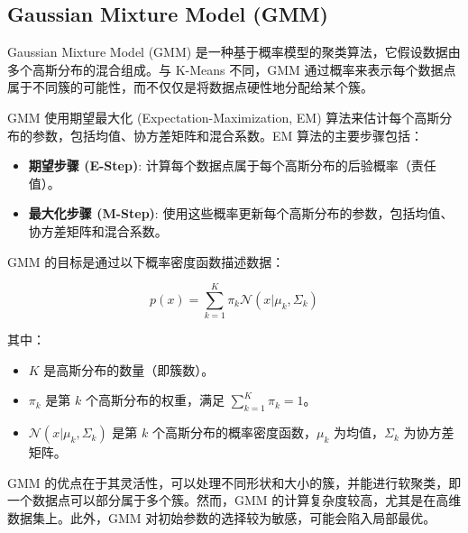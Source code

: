 \documentclass{article}
\begin{document}
\subsection{Gaussian Mixture Model (GMM)}

Gaussian Mixture Model (GMM) 是一种基于概率模型的聚类算法，它假设数据由多个高斯分布的混合组成。与 K-Means 不同，GMM 通过概率来表示每个数据点属于不同簇的可能性，而不仅仅是将数据点硬性地分配给某个簇。

GMM 使用期望最大化 (Expectation-Maximization, EM) 算法来估计每个高斯分布的参数，包括均值、协方差矩阵和混合系数。EM 算法的主要步骤包括：

\begin{itemize}
    \item \textbf{期望步骤 (E-Step)}: 计算每个数据点属于每个高斯分布的后验概率（责任值）。
    \item \textbf{最大化步骤 (M-Step)}: 使用这些概率更新每个高斯分布的参数，包括均值、协方差矩阵和混合系数。
\end{itemize}

GMM 的目标是通过以下概率密度函数描述数据：

\[
p(x) = \sum_{k=1}^{K} \pi_k \mathcal{N}(x | \mu_k, \Sigma_k)
\]

其中：
\begin{itemize}
    \item \( K \) 是高斯分布的数量（即簇数）。
    \item \( \pi_k \) 是第 \( k \) 个高斯分布的权重，满足 \(\sum_{k=1}^{K} \pi_k = 1\)。
    \item \( \mathcal{N}(x | \mu_k, \Sigma_k) \) 是第 \( k \) 个高斯分布的概率密度函数，\(\mu_k\) 为均值，\(\Sigma_k\) 为协方差矩阵。
\end{itemize}

GMM 的优点在于其灵活性，可以处理不同形状和大小的簇，并能进行软聚类，即一个数据点可以部分属于多个簇。然而，GMM 的计算复杂度较高，尤其是在高维数据集上。此外，GMM 对初始参数的选择较为敏感，可能会陷入局部最优。
\end{document}
